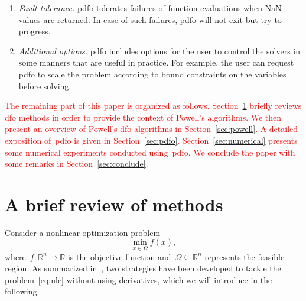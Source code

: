 \documentclass[
    smallextended,  %
    final,          %
]{svjour3}
\newcommand{\R}{\mathbb{R}}
\newcommand{\fset}{\Omega}
\newcommand{\obj}{f}
\newcommand{\red}{\textcolor{red}}
\begin{document}
\begin{enumerate}
    \item \emph{Fault tolerance.}
    \gls{pdfo} tolerates failures of function evaluations when NaN values are returned.
    In case of such failures, \gls{pdfo} will not exit but try to progress.

    \item \emph{Additional options.}
    \gls{pdfo} includes options for the user to control the solvers in some manners that are useful in practice.
    For example, the user can request \gls{pdfo} to scale the problem according to bound constraints on the variables before solving.
\end{enumerate}

\red{
The remaining part of this paper is organized as follows.
Section~\ref{sec:dfo} briefly reviews \gls{dfo} methods in order to provide the context of Powell's algorithms.
We then present an overview of Powell's \gls{dfo} algorithms in Section~\ref{sec:powell}.
A detailed exposition of~\gls{pdfo} is given in Section~\ref{sec:pdfo}.
Section~\ref{sec:numerical} presents some numerical experiments conducted using~\gls{pdfo}.
We conclude the paper with some remarks in Section~\ref{sec:conclude}.
}

\section{A brief review of  methods}
\label{sec:dfo}

Consider a nonlinear optimization problem
\begin{equation}
    \label{eq:nlc}
    \min_{x \in \fset} \obj(x),
\end{equation}
where~$\obj : \R^n \to \R$ is the objective function and~$\fset \subseteq \R^n$ represents the feasible region.
As summarized in~\cite{Conn_Scheinberg_Vicente_2009b}, two strategies have been developed to tackle
the problem~\eqref{eq:nlc} without using derivatives, which we will introduce in the following.
\end{document}
